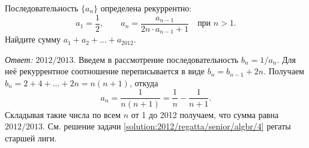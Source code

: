 Последовательность $\{ a_n \}$ определена рекуррентно:
\[
    a_1 = \frac{1}{2}
,\qquad
    a_n = \frac{a_{n - 1}}{2 n \cdot a_{n - 1} + 1}
    \quad\text{при $n > 1$}
.\]
Найдите сумму $a_1 + a_2 + \ldots + a_{2012}$.

\solution
\label{solution:2012/pers-algbr/junior/2}%
\emph{Ответ:} $2012 / 2013$.
%
Введем в рассмотрение последовательность $b_n = 1 / a_n$.
Для неё рекуррентное соотношение переписывается в виде $b_n = b_{n - 1} + 2 n$.
Получаем
$b_n = 2 + 4 + \ldots + 2 n = n (n + 1)$,
откуда
\[a_n = \frac{1}{n (n + 1)} = \frac{1}{n} - \frac{1}{n + 1}.\]
Складывая такие числа по всем $n$ от 1 до 2012 получаем, что сумма равна
$2012 / 2013$.
\else%
См. решение задачи \ref{solution:2012/regatta/senior/algbr/4} регаты старшей
лиги.
\fi

